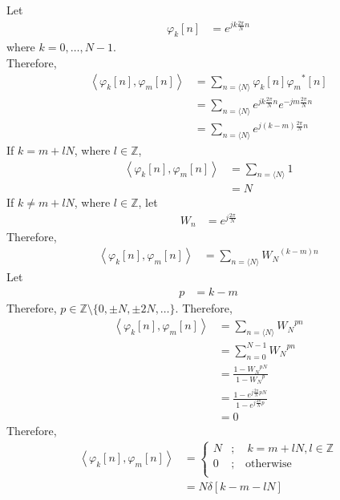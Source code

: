 \documentclass[titlepage, fleqn, a4paper, 12pt, twoside]{article}
\theoremstyle{definition}
\theoremstyle{theorem}
\begin{document}
Let
\begin{align*}
	\varphi_k[n] &= e^{j k \frac{2 \pi}{N} n}
\end{align*}
where $k = 0,\dots,N - 1$.\\
Therefore,
\begin{align*}
	\left\langle \varphi_k[n],\varphi_m[n] \right\rangle &= \sum\limits_{n = \langle N \rangle} \varphi_k[n] {\varphi_m}^*[n]\\
	&= \sum\limits_{n = \langle N \rangle} e^{j k \frac{2 \pi}{N} n} e^{-j m \frac{2 \pi}{N} n}\\
	&= \sum\limits_{n = \langle N \rangle} e^{j (k - m) \frac{2 \pi}{N} n}
\end{align*}
If $k = m + l N$, where $l \in \mathbb{Z}$,
\begin{align*}
	\left\langle \varphi_k[n],\varphi_m[n] \right\rangle &= \sum\limits_{n = \langle N \rangle} 1\\
	&= N
\end{align*}
If $k \neq m + l N$, where $l \in \mathbb{Z}$, let
\begin{align*}
	W_n &= e^{j \frac{2 \pi}{N}}
\end{align*}
Therefore,
\begin{align*}
	\left\langle \varphi_k[n],\varphi_m[n] \right\rangle &= \sum\limits_{n = \langle N \rangle} {W_N}^{(k - m) n}
\end{align*}
Let
\begin{align*}
	p &= k - m
\end{align*}
Therefore, $p \in \mathbb{Z} \setminus \{0,\pm N,\pm 2 N,\dots\}$.
Therefore,
\begin{align*}
	\left\langle \varphi_k[n],\varphi_m[n] \right\rangle &= \sum\limits_{n = \langle N \rangle} {W_N}^{p n}\\
	&= \sum\limits_{n = 0}^{N - 1} {W_N}^{p n}\\
	&= \frac{1 - {W_N}^{p N}}{1 - {W_N}^p}\\
	&= \frac{1 - e^{j \frac{2 \pi}{N} p N}}{1 - e^{j \frac{2 \pi}{N} p}}\\
	&= 0
\end{align*}
Therefore,
\begin{align*}
	\left\langle \varphi_k[n],\varphi_m[n] \right\rangle &=
		\begin{cases}
			N &;\quad k = m + l N, l \in \mathbb{Z}\\
			0 &;\quad \text{otherwise}\\
		\end{cases}\\
		&= N \delta[k - m - l N]
\end{align*}
\end{document}
